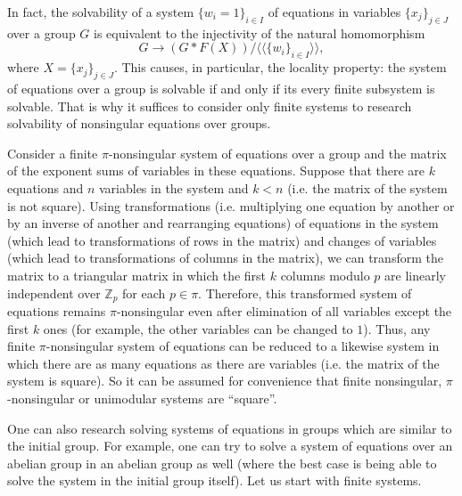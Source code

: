 \documentclass{article}
\theoremstyle{definition}
\theoremstyle{remark}
\begin{document}
In fact, the solvability of a system
$\{w_i=1\}_{i\in I}$ of equations in variables $\{x_j\}_{j\in J}$ over a group $G$
is equivalent to the injectivity of the natural homomorphism
$$
G \to \left( G \ast F(X) \right)
/
\langle \langle
\{w_i\}_{i \in I}
\rangle \rangle,
$$
where $X=\{x_j\}_{j\in J}$.
This causes, in particular, the locality property:
the system of equations over a group is solvable
if and only if its
every finite subsystem is solvable.
That is why
it suffices to consider only finite systems to research solvability
of nonsingular equations over groups.

Consider a finite $\pi$-nonsingular system of equations over a group
and the matrix of the exponent sums of variables in these equations.
Suppose that there are $k$ equations and $n$ variables in the system and $k<n$
(i.e. the matrix of the system is not square).
Using transformations
(i.e. multiplying one equation by another
or by an inverse of another and rearranging equations)
of equations in the system
(which lead to transformations of rows
in the matrix)
and changes of variables
(which lead to transformations of columns in the matrix),
we can transform the matrix to a triangular 
matrix in which the first $k$ columns modulo $p$
are linearly independent over $\mathbb Z_p$
for each $p\in \pi$.
Therefore, this transformed system of equations
remains $\pi$-nonsingular
even after elimination of all variables except the first $k$ ones
(for example, the other variables can be changed to $1$).
Thus, any finite $\pi$-nonsingular system of equations
can be reduced to a likewise system
in which there are as many equations as there
are variables (i.e. the matrix of the system is square).
So it can be assumed for convenience
that finite nonsingular, $\pi$-nonsingular or unimodular
systems are ``square''.

One can also research solving
systems of equations in groups which are similar
to the initial group.
For example, one can try to solve a
system of equations over an abelian group
in an abelian group as well
(where the best case is being able to solve
the system in the initial group itself).
Let us start with finite systems.
\end{document}
